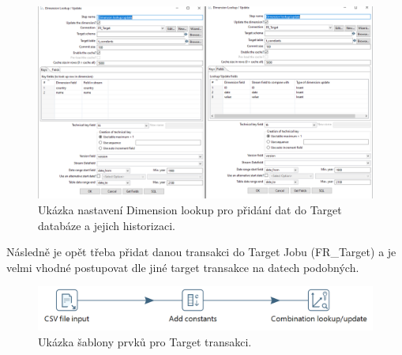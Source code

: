 \documentclass[thesis=M,czech]{FITthesis}[2022/10/08]
\begin{document}
\begin{figure}
    \centering
    \includegraphics[width=\textwidth]{DP-obrazky/Dim_lookup.png}
    \caption{Ukázka nastavení Dimension lookup pro přidání dat do Target databáze a jejich historizaci.}
    \label{fig:Dim_Lookup}
\end{figure}
 
Následně je opět třeba přidat danou transakci do Target Jobu (FR\_Target) a je velmi vhodné postupovat dle jiné target transakce na datech podobných.

\begin{figure}
    \centering
    \includegraphics[width=\textwidth]{DP-obrazky/target_sablona.png}
    \caption{Ukázka šablony prvků pro Target transakci.}
    \label{fig:Target_šablona}
\end{figure}
\end{document}
